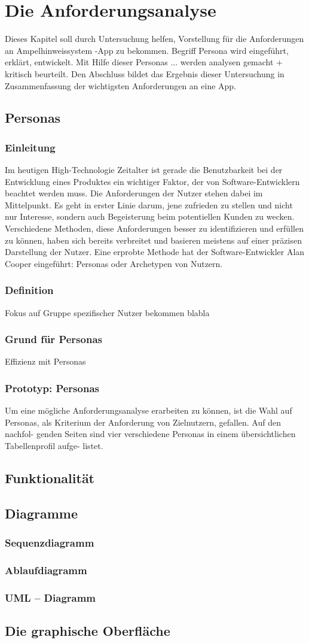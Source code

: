 \chapter{Die Anforderungsanalyse}
Dieses Kapitel soll durch Untersuchung helfen, Vorstellung für die Anforderungen an Ampelhinweissystem -App zu bekommen. Begriff Persona wird eingeführt, erklärt, entwickelt.
Mit Hilfe dieser Personas ... werden analysen gemacht + kritisch beurteilt.
Den Abschluss bildet das Ergebnis dieser Untersuchung in Zusammenfassung der wichtigsten Anforderungen an eine App.
\section{Personas}
\subsection*{Einleitung}
Im heutigen High-Technologie Zeitalter ist gerade die Benutzbarkeit bei der Entwicklung eines Produktes ein wichtiger Faktor, der von Software-Entwicklern beachtet werden muss. Die Anforderungen der Nutzer stehen dabei im Mittelpunkt. Es geht in erster Linie darum, jene zufrieden zu stellen und nicht nur Interesse, sondern auch Begeisterung beim potentiellen Kunden zu wecken. Verschiedene Methoden, diese Anforderungen besser zu identifizieren und erfüllen zu können, haben sich bereits verbreitet und basieren meistens auf einer präzisen Darstellung der Nutzer. Eine erprobte Methode hat der Software-Entwickler Alan Cooper eingeführt: Personas oder Archetypen von Nutzern.
\subsection*{Definition}
Fokus auf Gruppe spezifischer Nutzer bekommen blabla
\subsection*{Grund für Personas}
Effizienz mit Personas
\subsection*{Prototyp: Personas}
Um eine mögliche Anforderungsanalyse erarbeiten zu können, ist die
Wahl auf Personas, als Kriterium der Anforderung von Zielnutzern, gefallen. Auf den nachfol-
genden Seiten sind vier verschiedene Personas in einem übersichtlichen Tabellenprofil aufge-
listet.
\section{Funktionalität}
\section{Diagramme}
\subsection*{Sequenzdiagramm}
\subsection*{Ablaufdiagramm}
\subsection*{UML -- Diagramm}
\section{Die graphische Oberfläche}
